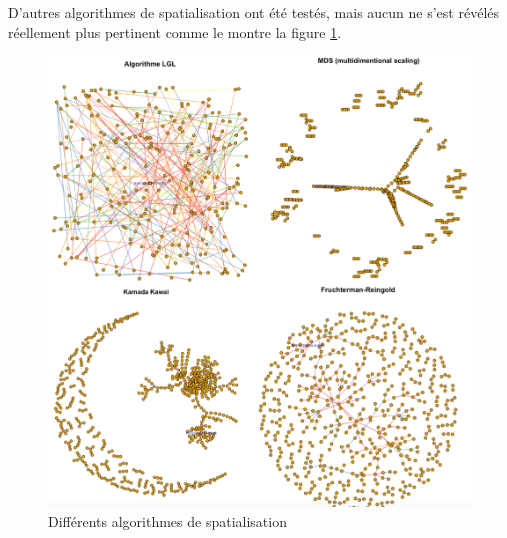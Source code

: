 D'autres algorithmes de spatialisation ont été testés, mais aucun ne s'est révélés réellement plus pertinent comme le montre la figure \ref{fig:layout}.

\begin{figure}
    \centering
    \includegraphics[scale=0.5]{3.Results/Img/layout.png}
    \caption{Différents algorithmes de spatialisation}
    \label{fig:layout}
\end{figure}
